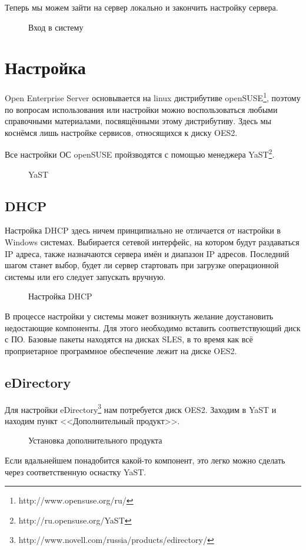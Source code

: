 Теперь мы можем зайти на сервер локально и закончить настройку сервера.
\begin{figure}[H]
\caption{Вход в систему}
\label{fig16}
\end{figure}
\clearpage

\section{Настройка}
Open Enterprise Server основывается на linux дистрибутиве openSUSE\footnote{http://www.opensuse.org/ru/}, поэтому по вопросам использования или настройки можно воспользоваться любыми справочными материалами, посвящёнными этому дистрибутиву. Здесь мы коснёмся лишь настройке сервисов, относящихся к диску OES2.\par 
Все настройки ОС openSUSE пройзводятся с помощью менеджера YaST\footnote{http://ru.opensuse.org/YaST}.
\begin{figure}[H]
\caption{YaST}
\label{yast}
\end{figure}
\clearpage

\subsection{DHCP}
Настройка DHCP здесь ничем принципиально не отличается от настройки в Windows системах. Выбирается сетевой интерфейс, на котором будут раздаваться IP адреса, также назначаются сервера имён и диапазон IP адресов. Последний шагом станет выбор, будет ли сервер стартовать при загрузке операционной системы или его следует запускать вручную.
\begin{figure}[H]
\caption{Настройка DHCP}
\label{dhcp}
\end{figure}
В процессе настройки у системы может возникнуть желание доустановить недостающие компоненты. Для этого необходимо вставить соответствующий диск с ПО. Базовые пакеты находятся на дисках SLES, в то время как всё проприетарное программное обеспечение лежит на диске OES2.
\clearpage

\subsection{eDirectory}
Для настройки eDirectory\footnote{http://www.novell.com/russia/products/edirectory/} нам потребуется диск OES2. Заходим в YaST и находим пункт <<Дополнительный продукт>>. 
\begin{figure}[H]
\caption{Установка дополнительного продукта}
\end{figure}
Если вдальнейшем понадобится какой-то компонент, это легко можно сделать через соответственную оснастку YaST.
\clearpage


